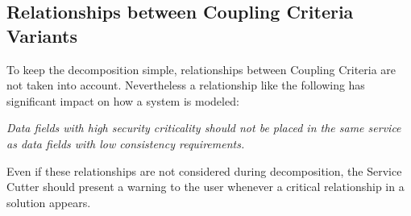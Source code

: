 \subsection{Relationships between Coupling Criteria Variants}

To keep the decomposition simple, relationships between Coupling Criteria are not taken into account. Nevertheless a relationship like the following has significant impact on how a system is modeled:

\textit{Data fields with high security criticality should not be placed in the same service as data fields with low consistency requirements.}

Even if these relationships are not considered during decomposition, the Service Cutter should present a warning to the user whenever a critical relationship in a solution appears.
